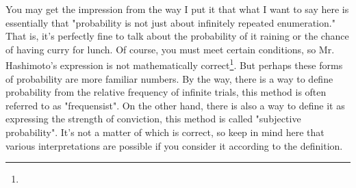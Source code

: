 \documentclass{ltjbook}
\begin{document}
You may get the impression from the way I put it that what I want to say here is essentially that "probability is not just about infinitely repeated enumeration." That is, it's perfectly fine to talk about the probability of it raining or the chance of having curry for lunch. Of course, you must meet certain conditions, so Mr. Hashimoto's expression is not mathematically correct\footnote{}. But perhaps these forms of probability are more familiar numbers. By the way, there is a way to define probability from the relative frequency of infinite trials, this method is often referred to as "frequensist". On the other hand, there is also a way to define it as expressing the strength of conviction, this method is called "subjective probability". It's not a matter of which is correct, so keep in mind here that various interpretations are possible if you consider it according to the definition.

\end{document}
